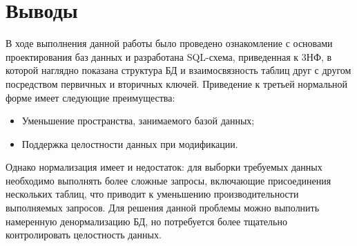 \section{Выводы}

В ходе выполнения данной работы было проведено ознакомление с основами проектирования баз данных и разработана SQL-схема, приведенная к 3НФ, в которой наглядно показана структура БД и взаимосвязность таблиц друг с другом посредством первичных и вторичных ключей. Приведение к третьей нормальной форме имеет следующие преимущества:

\begin{itemize}
	\item Уменьшение пространства, занимаемого базой данных;
	\item Поддержка целостности данных при модификации.
\end{itemize}

Однако нормализация имеет и недостаток: для выборки требуемых данных необходимо выполнять более сложные запросы, включающие присоединения нескольких таблиц, что приводит к уменьшению производительности выполняемых запросов. Для решения данной проблемы можно выполнить намеренную денормализацию БД, но потребуется более тщательно контролировать целостность данных.